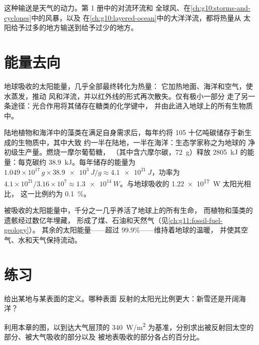 这种输送是天气的动力。第 1 册中的对流环流和
全球风、在\cref{ch:g10:storms-and-cyclones}中的风暴，以及
在\cref{ch:g10:layered-ocean}中的大洋洋流，都将热量从
太阳给予过多的地方输送到给予过少的地方。

\section{能量去向}

地球吸收的太阳能量，几乎全部最终转化为热量：
它加热地面、海洋和空气，使水蒸发，推动
风和洋流，并以红外线的形式再次散失。仅有极小一部分
走了另一条途径：光合作用将其储存在糖类的化学键中，
并由此进入地球上的所有生物质中。

\begin{example}[光合作用的份额]\label{ex:g10:earth-energy-budget:photosynthesis}
陆地植物和海洋中的藻类在满足自身需求后，每年约将
\num{105} 十亿吨碳储存于新生成的生物质中，其中大致
约一半在陆地，一半在海洋：生态学家称之为地球的
净初级生产量。燃烧一摩尔葡萄糖，
（其中含六摩尔碳，\qty{72}{g}）释放
\qty{2805}{kJ} 的能量：每克碳约 \qty{38.9}{kJ}。每年储存的能量为
$1.049\times10^{17}\,\unit{g} \times \qty{38.9e3}{J/g} \approx
\qty{4.1e21}{J}$，功率为 $4.1\times10^{21}/3.16\times10^{7} \approx
\qty{1.3e14}{W}$。与地球吸收的 \qty{1.22e17}{W} 太阳光相比，
这一比例约为 \qty{0.1}{\percent}。
\end{example}

\begin{remark}\label{rem:g10:earth-energy-budget:life}
被吸收的太阳能量中，千分之一几乎养活了地球上的所有生命，
而植物和藻类的遗骸经过数亿年埋藏，
形成了煤、石油和天然气（见\cref{ch:g11:fossil-fuel-geology}）。
其余的太阳能量——超过 99.9\%——维持着地球的温暖，
并使其空气、水和天气保持流动。
\end{remark}

\section{练习}

\begin{exercise}[$\star$]\label{exo:g10:earth-energy-budget:1}
给出某地与某表面的定义。哪种表面
反射的太阳光比例更大：新雪还是开阔海洋？
\end{exercise}

\begin{exercise}[$\star$]\label{exo:g10:earth-energy-budget:2}
利用本章的图，以到达大气层顶的
\qty{340}{W/m^2} 为基准，分别求出被反射回太空的
部分、被大气吸收的部分以及
被地表吸收的部分各占的百分比。
\end{exercise}

